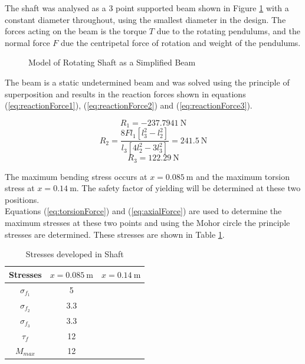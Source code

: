 The shaft was analysed as a 3 point supported beam shown in Figure \ref{fig:supp_beam} with a constant diameter throughout, using the smallest diameter in the design. The forces acting on the beam is the torque $T$ due to the rotating pendulums, and the normal force $F$ due the centripetal force of rotation and weight of the pendulums.\\


\begin{figure}[h]
	\centering
	
	\caption{Model of Rotating Shaft as a Simplified Beam}
	\label{fig:supp_beam}
\end{figure}

The beam is a static undetermined beam and was solved using the principle of superposition and results in the reaction forces shown in equations (\ref{eq:reactionForce1}), (\ref{eq:reactionForce2}) and (\ref{eq:reactionForce3}).

\begin{equation} \label{eq:reactionForce1}
R_{1} = \SI{-237.7941}{\newton}
\end{equation}
\begin{equation} \label{eq:reactionForce2}
R_{2} = \frac{ 8Fl_{1}[l_{3}^2 - l_{2}^2] }{l_{3}[4l_{2}^2-3l_{3}^2] } = \SI{241.5}{\newton}
\end{equation}
\begin{equation} \label{eq:reactionForce3}
R_{3} = \SI{122.29}{\newton}
\end{equation}

The maximum bending stress occurs at $x=\SI{0.085}{\meter}$ and the maximum torsion stress at $x=\SI{0.14}{\meter}$. The safety factor of yielding will be determined at these two positions.\\

Equations (\ref{eq:torsionForce}) and (\ref{eq:axialForce}) are used to determine the maximum stresses at these two points and using the Mohor circle the principle stresses are determined.  These stresses are shown in Table \ref{table:stresses}.\\


\begin{table}[]
	\centering
	\begin{tabular}{|c|c|c|}
		\hline
		Stresses & $x = \SI{0.085}{\meter}$ & $x=\SI{0.14}{\meter}$ \\
		\hline
		\hline
		$\sigma_{f_{1}}$ & \SI{5}{} & \\
		\hline
		$\sigma_{f_{2}}$ & \SI{3.3}{}& \\
		\hline
		$\sigma_{f_{3}}$ & \SI{3.3}{}& \\
		\hline
		$\tau_{f}$ & \SI{12}{}&  \\
		\hline
		$M_{max}$ & \SI{12}{}& \\
		\hline
	\end{tabular}
	\caption{Stresses developed in Shaft}
	\label{table:stresses}
\end{table}

